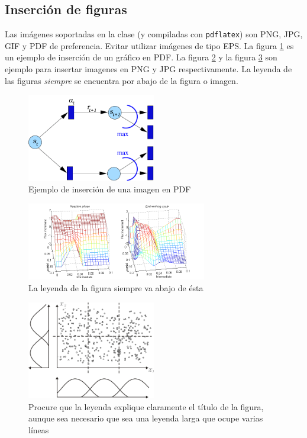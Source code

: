 \subsection{Inserción de figuras}


Las imágenes soportadas en la clase (y compiladas con \verb+pdflatex+)
son PNG, JPG, GIF y PDF de preferencia. Evitar utilizar imágenes de
tipo EPS. La figura \ref{fig:pdf} es un ejemplo de inserción de un
gráfico en PDF. La figura \ref{fig:png} y la figura \ref{fig:jpg} son
ejemplo para insertar imagenes en PNG y JPG respectivamente. La
leyenda de las figuras \emph{siempre} se encuentra por abajo de la
figura o imagen. 

\begin{figure}[tb!]
	\centering
    \includegraphics[width=0.5\textwidth]{tesislcc/ejemplo1.pdf}
    \caption{Ejemplo de inserción de una imagen en PDF}
    \label{fig:pdf}
\end{figure}

\begin{figure}[htb!]
	\centering
    \includegraphics[width=0.7\textwidth]{tesislcc/ejemplo2.png}
    \caption{La leyenda de la figura siempre va abajo de ésta}
    \label{fig:png}
\end{figure}

\begin{figure}[htb!]
	\centering
    \includegraphics[width=0.5\textwidth]{tesislcc/ejemplo3.jpg}
    \caption{Procure que la leyenda explique claramente el
        título de la figura, aunque sea necesario que sea una leyenda
        larga que ocupe varias líneas}
    \label{fig:jpg}
\end{figure}


